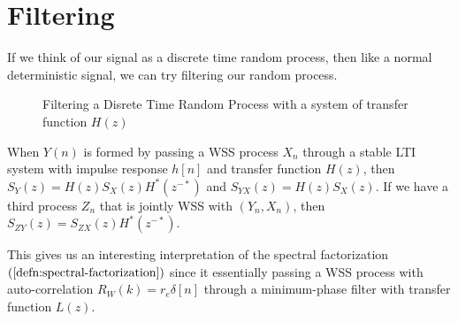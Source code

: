 \section{Filtering}
If we think of our signal as a discrete time random process, then like a normal deterministic signal, we can try filtering our random process.
\begin{gitbook-image}
\begin{figure}[!h]
  \centering
	\caption{Filtering a Disrete Time Random Process with a system of transfer function $H(z)$}
  \label{fig:lti-filtering}
\end{figure}
\end{gitbook-image}
\begin{theorem}
	When $Y(n)$ is formed by passing a WSS process $X_n$ through a stable LTI system with impulse response $h[n]$ and transfer function $H(z)$, then $S_Y(z) = H(z)S_X(z)H^*(z^{-*})$ and $S_{YX}(z) = H(z)S_X(z)$.
	If we have a third process $Z_n$ that is jointly WSS with $(Y_n, X_n)$, then $S_{ZY}(z) = S_{ZX}(z)H^*(z^{-*})$.
	\label{thm:lti-process}
\end{theorem}
This gives us an interesting interpretation of the spectral factorization $(\cref{defn:spectral-factorization})$ since it essentially passing a WSS process with auto-correlation $R_W(k) = r_e\delta[n]$ through a minimum-phase filter with transfer function $L(z)$.
